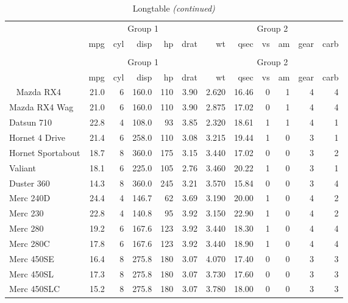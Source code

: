 \documentclass[table]{article}
\begin{document}
\begin{longtable}{lrrrrrrrrrrr}
\caption{\label{tab:unnamed-chunk-11}Longtable}\\
\toprule
\multicolumn{1}{c}{ } & \multicolumn{5}{c}{Group 1} & \multicolumn{6}{c}{Group 2} \\
\cmidrule(l{3pt}r{3pt}){2-6} \cmidrule(l{3pt}r{3pt}){7-12}
  & mpg & cyl & disp & hp & drat & wt & qsec & vs & am & gear & carb\\
\midrule
\endfirsthead
\caption[]{Longtable \textit{(continued)}}\\
\toprule
\multicolumn{1}{c}{ } & \multicolumn{5}{c}{Group 1} & \multicolumn{6}{c}{Group 2} \\
\cmidrule(l{3pt}r{3pt}){2-6} \cmidrule(l{3pt}r{3pt}){7-12}
  & mpg & cyl & disp & hp & drat & wt & qsec & vs & am & gear & carb\\
\midrule
\endhead
\
\endfoot
\bottomrule
\endlastfoot
Mazda RX4 & 21.0 & 6 & 160.0 & 110 & 3.90 & 2.620 & 16.46 & 0 & 1 & 4 & 4\\
Mazda RX4 Wag & 21.0 & 6 & 160.0 & 110 & 3.90 & 2.875 & 17.02 & 0 & 1 & 4 & 4\\
Datsun 710 & 22.8 & 4 & 108.0 & 93 & 3.85 & 2.320 & 18.61 & 1 & 1 & 4 & 1\\
Hornet 4 Drive & 21.4 & 6 & 258.0 & 110 & 3.08 & 3.215 & 19.44 & 1 & 0 & 3 & 1\\
Hornet Sportabout & 18.7 & 8 & 360.0 & 175 & 3.15 & 3.440 & 17.02 & 0 & 0 & 3 & 2\\
\addlinespace
Valiant & 18.1 & 6 & 225.0 & 105 & 2.76 & 3.460 & 20.22 & 1 & 0 & 3 & 1\\
Duster 360 & 14.3 & 8 & 360.0 & 245 & 3.21 & 3.570 & 15.84 & 0 & 0 & 3 & 4\\
Merc 240D & 24.4 & 4 & 146.7 & 62 & 3.69 & 3.190 & 20.00 & 1 & 0 & 4 & 2\\
Merc 230 & 22.8 & 4 & 140.8 & 95 & 3.92 & 3.150 & 22.90 & 1 & 0 & 4 & 2\\
Merc 280 & 19.2 & 6 & 167.6 & 123 & 3.92 & 3.440 & 18.30 & 1 & 0 & 4 & 4\\
\addlinespace
Merc 280C & 17.8 & 6 & 167.6 & 123 & 3.92 & 3.440 & 18.90 & 1 & 0 & 4 & 4\\
Merc 450SE & 16.4 & 8 & 275.8 & 180 & 3.07 & 4.070 & 17.40 & 0 & 0 & 3 & 3\\
Merc 450SL & 17.3 & 8 & 275.8 & 180 & 3.07 & 3.730 & 17.60 & 0 & 0 & 3 & 3\\
Merc 450SLC & 15.2 & 8 & 275.8 & 180 & 3.07 & 3.780 & 18.00 & 0 & 0 & 3 & 3\\

\end{longtable}
\end{document}
